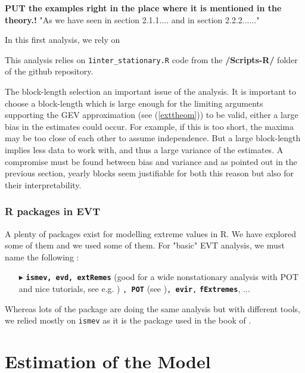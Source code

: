 
\textbf{PUT the examples right in the place where it is mentioned in the theory.!} 
"As we have seen in section 2.1.1.... and in section 2.2.2......"

In this first analysis, we rely on 

This analysis relies on \texttt{1inter\_stationary.R} code from the \textbf{/Scripts-R/} folder of the github repository.



The block-length selection an important issue of the analysis. It is important to choose a block-length which is large enough for the limiting arguments supporting the GEV approximation (see (\ref{exttheom})) to be valid, either a large bias in the estimates could occur. For example, if this is too short, the maxima may be too close of each other to assume independence. But a large block-length implies less data to work with, and thus a large variance of the estimates. A compromise must be found between bias and variance and as pointed out in the previous section, yearly blocks seem justifiable for both this reason but also for their interpretability.

\subsubsection*{R packages in EVT}

A plenty of packages exist for modelling extreme values in R. We have explored some of them and we used some of them. For "basic" EVT analysis, we must name the following : 
\vspace*{-.2cm}
\begin{itemize}
\item[$\blacktriangleright$] \textbf{\texttt{ismev, evd, extRemes}} (good for a wide nonstationary analysis with POT and nice tutorials, see e.g. \citet{gilleland_extremes_2016})  \texttt{, \textbf{POT}} (see \citet{ribatet_users_2006})\texttt{, \textbf{evir},} \texttt{\textbf{fExtremes}}, $\dots$
\end{itemize}

Whereas lots of the package are doing the same analysis but with different tools, we relied mostly on \texttt{ismev} as it is the package used in the book of \citet{coles_introduction_2001}.

\section{Estimation of the Model}

